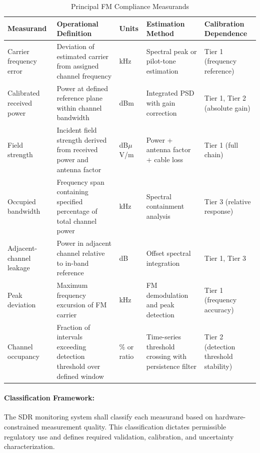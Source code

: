 \documentclass[11pt]{report}
\begin{document}
\begin{table}[h!]
	\centering
	\renewcommand{\arraystretch}{1.3}
	\caption{Principal FM Compliance Measurands}\label{tab:fm_measurands_operational}
	\begin{tabular}{@{}p{3.2cm}p{2.8cm}p{2.2cm}p{2.8cm}p{2.8cm}@{}}
		\toprule
		\textbf{Measurand} & \textbf{Operational Definition} & \textbf{Units} & \textbf{Estimation Method} & \textbf{Calibration Dependence} \\ \midrule
		Carrier frequency error & Deviation of estimated carrier from assigned channel frequency & kHz & Spectral peak or pilot-tone estimation & Tier 1 (frequency reference) \\
		Calibrated received power & Power at defined reference plane within channel bandwidth & dBm & Integrated PSD with gain correction & Tier 1, Tier 2 (absolute gain) \\
		Field strength & Incident field strength derived from received power and antenna factor & dB$\mu$V/m & Power + antenna factor + cable loss & Tier 1 (full chain) \\
		Occupied bandwidth & Frequency span containing specified percentage of total channel power & kHz & Spectral containment analysis & Tier 3 (relative response) \\
		Adjacent-channel leakage & Power in adjacent channel relative to in-band reference & dB & Offset spectral integration & Tier 1, Tier 3 \\
		Peak deviation & Maximum frequency excursion of FM carrier & kHz & FM demodulation and peak detection & Tier 1 (frequency accuracy) \\
		Channel occupancy & Fraction of intervals exceeding detection threshold over defined window & \% or ratio & Time-series threshold crossing with persistence filter & Tier 2 (detection threshold stability) \\ \bottomrule
	\end{tabular}
\end{table}

\paragraph*{Classification Framework:} \;

\noindent The SDR monitoring system shall classify each measurand based on hardware-constrained measurement quality. This classification dictates permissible regulatory use and defines required validation, calibration, and uncertainty characterization.
\end{document}
